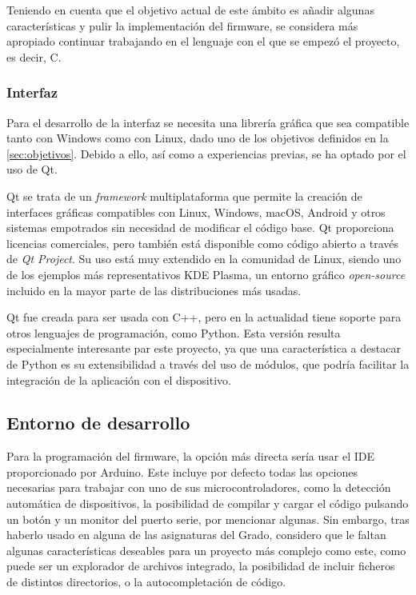 Teniendo en cuenta que el objetivo actual de este ámbito es añadir algunas características y pulir la implementación del firmware, se considera más apropiado continuar trabajando en el lenguaje con el que se empezó el proyecto, es decir, C. 

\subsubsection{Interfaz}

Para el desarrollo de la interfaz se necesita una librería gráfica que sea compatible tanto con Windows como con Linux, dado uno de los objetivos definidos en la \autoref{sec:objetivos}. Debido a ello, así como a experiencias previas, se ha optado por el uso de Qt.

Qt se trata de un \textit{framework} multiplataforma que permite la creación de interfaces gráficas compatibles con Linux, Windows, macOS, Android y otros sistemas empotrados sin necesidad de modificar el código base. Qt proporciona licencias comerciales, pero también está disponible como código abierto a través de \textit{Qt Project}. Su uso está muy extendido en la comunidad de Linux, siendo uno de los ejemplos más representativos KDE Plasma\cite{kde-plasma}, un entorno gráfico \textit{open-source} incluido en la mayor parte de las distribuciones más usadas.

Qt fue creada para ser usada con C++, pero en la actualidad tiene soporte para otros lenguajes de programación, como Python. Esta versión resulta especialmente interesante par este proyecto, ya que una característica a destacar de Python es su extensibilidad a través del uso de módulos, que podría facilitar la integración de la aplicación con el dispositivo.

\subsection{Entorno de desarrollo}

Para la programación del firmware, la opción más directa sería usar el IDE proporcionado por Arduino. Este incluye por defecto todas las opciones necesarias para trabajar con uno de sus microcontroladores, como la detección automática de dispositivos, la posibilidad de compilar y cargar el código pulsando un botón y un monitor del puerto serie, por mencionar algunas. Sin embargo, tras haberlo usado en alguna de las asignaturas del Grado, considero que le faltan algunas características deseables para un proyecto más complejo como este, como puede ser un explorador de archivos integrado, la posibilidad de incluir ficheros de distintos directorios, o la autocompletación de código.

